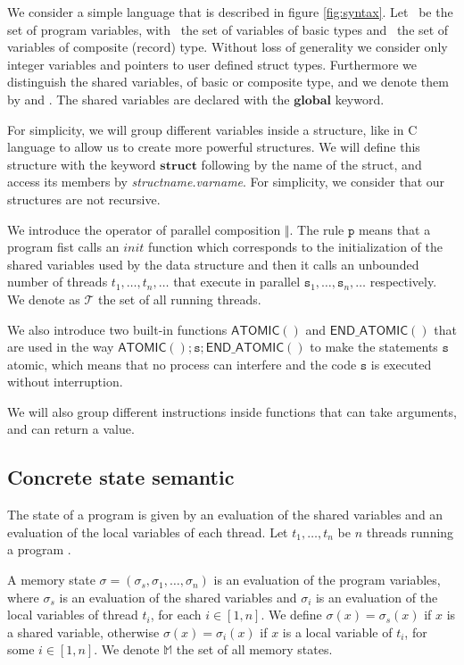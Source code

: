 \documentclass[runningheads]{llncs}
\newcommand\prule{\mathtt{p}}
\newcommand\srule{\mathtt{s}}
\newcommand{\structinst}{\mathbf{struct}}
\newcommand{\globalinst}{\mathbf{global}}
\newcommand{\atomicbegin}{\mathsf{ATOMIC()}}
\newcommand{\atomicend}{\mathsf{END\_ATOMIC()}}
\newcommand{\Memory}{\mathbb{M}}
\newcommand{\Thread}{\mathcal T}
\begin{document}
	We consider a simple language that is described in figure \ref{fig:syntax}. Let \vars\ be the set of program variables, with \nvars\ the set of  variables of basic types and \pvars\ the set of variables of composite (record) type. 
Without loss of generality we consider only integer variables  and pointers to  user defined struct types. 
Furthermore we distinguish the shared variables, of basic or composite type, and we denote them by \snvars and \spvars. The shared variables are declared with the $\globalinst$ keyword.

For simplicity, we will group different variables inside a structure, like in C language to allow us to create more powerful structures. We will define this structure with the keyword $\structinst$ following by the name of the struct, and access its members by \textit{structname.varname}. For simplicity, we consider that our structures are not recursive. 

 We introduce the operator of parallel composition $\Vert$. The rule $\prule$ means that a program fist calls an $init$ function which corresponds to the initialization of the shared variables used by the data structure and then it calls an unbounded number of threads $t_1, \dots, t_n, \dots$ that execute in parallel $\srule_1, \dots, \srule_n, \dots$ respectively. We denote as $\Thread$ the set of all running threads. 
 
	We also introduce two built-in functions $\atomicbegin$ and $\atomicend$ that are used in the way $\atomicbegin ; \srule ; \atomicend$ to make the statements $\srule$ atomic, which means that no process can interfere and the code $\srule$ is executed without interruption. 
	
	
	
We will also group different instructions inside functions that can take arguments, and can return a value.
	
	\subsection{Concrete state semantic}
	
	

The state of a program is given by an evaluation of the shared variables and an evaluation of the local variables of each thread. 
Let $t_1,\ldots, t_n$ be $n$ threads running a program \prog. 



A memory state $\sigma=(\sigma_s, \sigma_{1}, \ldots ,\sigma_{n})$ is an evaluation of the program variables, where $\sigma_s$ is an evaluation of the shared variables and $\sigma_{i}$ is an evaluation of the local variables of thread $t_i$, for each $i\in [1,n]$. 
We define 
$\sigma(x)=\sigma_s(x)$ if $x$ is a shared variable, otherwise $\sigma(x)=\sigma_i(x)$ if $x$ is a local variable of $t_i$, for some $i\in[1,n]$.  We denote $\Memory$ the set of all memory states. 
\end{document}
